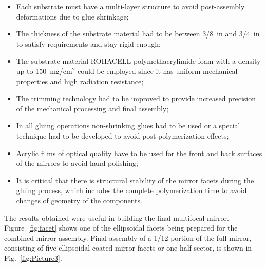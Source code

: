\begin{itemize}
    \item Each substrate must have a multi-layer structure to avoid post-assembly deformations due to glue shrinkage;
    \item The thickness of the substrate material had to be between 3/8~in and 3/4~in to satisfy requirements and stay rigid enough;
    \item The substrate material ROHACELL polymethacrylimide foam with a density up to 150~mg/cm$^2$ could be
      employed since it has uniform mechanical properties and high radiation resistance;
    \item The trimming technology had to be improved to provide increased precision of the mechanical processing and
      final assembly;
    \item In all gluing operations non-shrinking glues had to be used or a special technique had to be developed to avoid
      post-polymerization effects;
    \item Acrylic films of optical quality have to be used for the front and back surfaces of the mirrors to avoid hand-polishing;
    \item It is critical that there is structural stability of the mirror facets during the gluing process, which includes
      the complete polymerization time to avoid changes of geometry of the components.
    \end{itemize}

The results obtained were useful in building the final multifocal mirror. Figure~\ref{fig:facet} shows one of the
ellipsoidal facets being prepared for the combined mirror assembly. Final assembly of a 1/12 portion of the full
mirror, consisting of five ellipsoidal coated mirror facets or one half-sector, is shown in Fig.~\ref{fig:Picture3}.

